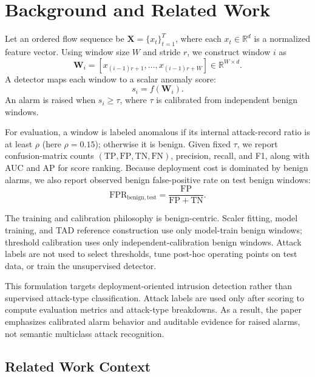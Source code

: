 \section{Background and Related Work}
\label{sec:bg}

Let an ordered flow sequence be \(\mathbf{X}=\{x_t\}_{t=1}^{T}\), where each \(x_t\in\mathbb{R}^{d}\) is a normalized feature vector. Using window size \(W\) and stride \(r\), we construct window \(i\) as
\begin{equation}
\mathbf{W}_i=[x_{(i-1)r+1},\ldots,x_{(i-1)r+W}] \in \mathbb{R}^{W\times d}.
\end{equation}
A detector maps each window to a scalar anomaly score:
\begin{equation}
s_i=f(\mathbf{W}_i).
\end{equation}
An alarm is raised when \(s_i\ge\tau\), where \(\tau\) is calibrated from independent benign windows.

For evaluation, a window is labeled anomalous if its internal attack-record ratio is at least \(\rho\) (here \(\rho=0.15\)); otherwise it is benign. Given fixed \(\tau\), we report confusion-matrix counts \((\mathrm{TP},\mathrm{FP},\mathrm{TN},\mathrm{FN})\), precision, recall, and F1, along with AUC and AP for score ranking. Because deployment cost is dominated by benign alarms, we also report observed benign false-positive rate on test benign windows:
\begin{equation}
\mathrm{FPR}_{\mathrm{benign,test}}=\frac{\mathrm{FP}}{\mathrm{FP}+\mathrm{TN}}.
\end{equation}

The training and calibration philosophy is benign-centric. Scaler fitting, model training, and TAD reference construction use only model-train benign windows; threshold calibration uses only independent-calibration benign windows. Attack labels are not used to select thresholds, tune post-hoc operating points on test data, or train the unsupervised detector.

This formulation targets deployment-oriented intrusion detection rather than supervised attack-type classification. Attack labels are used only after scoring to compute evaluation metrics and attack-type breakdowns. As a result, the paper emphasizes calibrated alarm behavior and auditable evidence for raised alarms, not semantic multiclass attack recognition.

\subsection{Related Work Context}

